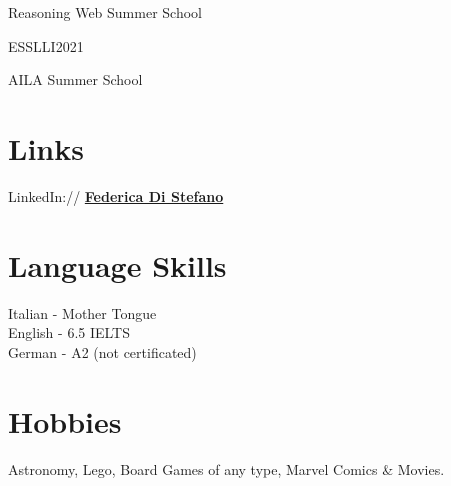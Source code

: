 \documentclass[letterpaper]{deedy-resume} %
\begin{document}
\begin{minipage}[t]{0.33\textwidth}

\sectionspace
\begin{tightitemize}
\item Reasoning Web Summer School
\item ESSLLI2021
\item AILA Summer School
\end{tightitemize}
\sectionspace
\section{Links} 

LinkedIn:// \href{https://www.linkedin.com/in/federica-di-stefano-a04673194/}{\bf Federica Di Stefano} \\

\sectionspace %
\section{Language Skills}
Italian - Mother Tongue \\
English - 6.5 IELTS\\
German - A2 (not certificated) 
\sectionspace
\section{Hobbies}
Astronomy, 
Lego\textregistered, 
Board Games of any type,
Marvel Comics \& Movies.



\end{minipage}
\end{document}
